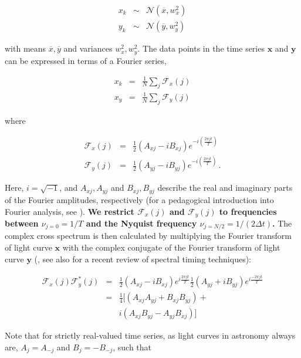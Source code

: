 \documentclass[12pt]{emulateapj}
\begin{document}
\begin{eqnarray}
x_k &\sim& \mathcal{N}(\overline{x}, w_x^2)  \nonumber \\
y_k &\sim& \mathcal{N}(\overline{y}, w_y^2) \nonumber
\end{eqnarray} 

\noindent with means $\overline{x}, \overline{y}$ and variances $w_x^2, w_y^2$. The data points in the time series $\mathbf{x}$ and $\mathbf{y}$ can be expressed in terms of a Fourier series,

\begin{eqnarray}
x_k & = & \frac{1}{N} \sum_{j}{\mathcal{F}_x(j)} \nonumber \\
x_y & = & \frac{1}{N} \sum_{j}{\mathcal{F}_y(j)}
\end{eqnarray}

\noindent where

\begin{eqnarray}
\mathcal{F}_x(j) &= & \frac{1}{2} (A_{xj} - i B_{xj}) e^{-i\left( \frac{2 \pi j t}{T} \right)} \\
\mathcal{F}_y(j) &= & \frac{1}{2} (A_{yj} - i B_{yj}) e^{-i\left( \frac{2 \pi j t}{T} \right)} \, .
\end{eqnarray}

\noindent Here, $i = \sqrt{-1}$, and $A_{xj}, A_{yj}$ and $B_{xj}, B_{yj}$ describe the real and imaginary parts of the Fourier amplitudes, respectively (for a pedagogical introduction into Fourier analysis, see \citealt{vanderklis1989}). \textbf{We restrict $\mathcal{F}_x(j)$ and $\mathcal{F}_y(j)$ to frequencies between $\nu_{j=0} = 1/T$ and the Nyquist frequency $\nu_{j=N/2} = 1/(2\Delta t)$.}
The complex cross spectrum is then calculated by multiplying the Fourier transform of light curve $\mathbf{x}$ with the complex conjugate of the Fourier transform of light curve $\mathbf{y}$ (\citealt{vaughan1997,nowak1999}, see also \citealt{uttley2014} for a recent review of spectral timing techniques):

\begin{eqnarray}
\mathcal{F}_x(j) \mathcal{F}_y^*(j) & = & \frac{1}{2} (A_{xj} - i B_{xj}) e^{i \frac{2 \pi j t}{T}} \frac{1}{2} (A_{yj} + i B_{yj}) e^{i \frac{-2 \pi j t}{T}}\nonumber \\ 
		     & = & \frac{1}{4} [ (A_{xj}A_{yj} + B_{xj}B_{yj}) + \\\nonumber
		     & &  i (A_{xj}B_{yj} - A_{yj}B_{xj}) ]
\end{eqnarray}

Note that for strictly real-valued time series, as light curves in astronomy always are, $A_j = A_{-j}$ and $B_j = - B_{-j}$, such that 
\end{document}

